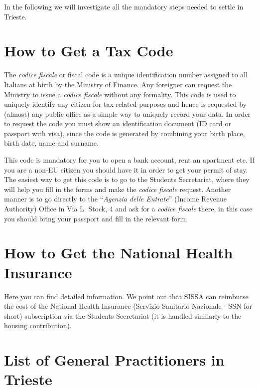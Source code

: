 \documentclass{sissavademecum}
\begin{document}
In the following we will investigate all the mandatory steps needed to settle in Trieste.


\section{How to Get a Tax Code}

The \textit{codice fiscale} or fiscal code is a unique identification number assigned to all Italians at birth by the Ministry of Finance. Any foreigner can request the Ministry to issue a \textit{codice fiscale} without any formality. This code is used to uniquely identify any citizen for tax-related purposes and hence is requested by (almost) any public office as a simple way to uniquely record your data. In order to request the code you must show an identification document (ID card or passport with visa), since the code is generated by combining your birth place, birth date, name and surname.

This code is mandatory for you to open a bank account, rent an apartment etc. If you are a non-EU citizen you should have it in order to get your permit of stay. The easiest way to get this code is to go to the Students Secretariat, where they will help you fill in the forms and make the \textit{codice fiscale} request. Another manner is to go directly to the ``\textit{Agenzia delle Entrate}'' (Income Revenue Authority) Office in Via L. Stock, 4 and ask for a \textit{codice fiscale} there, in this case you should bring your passport and fill in the relevant form.

\vspace{-0.4cm}


\section{How to Get the National Health Insurance}

\href{http://wiki.sissa.it/students/index.php/Health_Insurance}{Here} you can find detailed information. We point out that SISSA can reimburse the cost of the National Health Insurance (Servizio Sanitario Nazionale - SSN for short) subscription via the Students Secretariat (it is handled similarly to the housing contribution).


\section{List of General Practitioners in Trieste}
\end{document}
